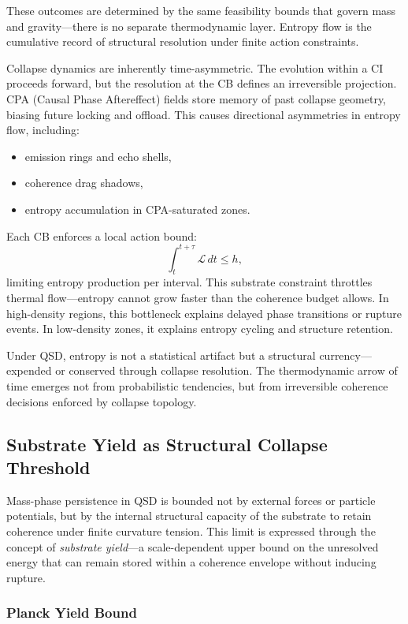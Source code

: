 \documentclass[preprints,article,submit,pdftex,moreauthors]{Definitions/mdpi}
\begin{document}
These outcomes are determined by the same feasibility bounds that govern mass and gravity—there is no separate thermodynamic layer. Entropy flow is the cumulative record of structural resolution under finite action constraints.

Collapse dynamics are inherently time-asymmetric. The evolution within a CI proceeds forward, but the resolution at the CB defines an irreversible projection. CPA (Causal Phase Aftereffect) fields store memory of past collapse geometry, biasing future locking and offload. This causes directional asymmetries in entropy flow, including:
\begin{itemize}
    \item emission rings and echo shells,
    \item coherence drag shadows,
    \item entropy accumulation in CPA-saturated zones.
\end{itemize}

Each CB enforces a local action bound:
\[
\int_{t}^{t+\tau} \mathcal{L} \, dt \le h,
\]
limiting entropy production per interval. This substrate constraint throttles thermal flow—entropy cannot grow faster than the coherence budget allows. In high-density regions, this bottleneck explains delayed phase transitions or rupture events. In low-density zones, it explains entropy cycling and structure retention.

Under QSD, entropy is not a statistical artifact but a structural currency—expended or conserved through collapse resolution. The thermodynamic arrow of time emerges not from probabilistic tendencies, but from irreversible coherence decisions enforced by collapse topology.




\subsection{Substrate Yield as Structural Collapse Threshold}

Mass-phase persistence in QSD is bounded not by external forces or particle potentials, but by the internal structural capacity of the substrate to retain coherence under finite curvature tension. This limit is expressed through the concept of \textit{substrate yield}—a scale-dependent upper bound on the unresolved energy that can remain stored within a coherence envelope without inducing rupture.

\subsubsection*{Planck Yield Bound}
\end{document}
